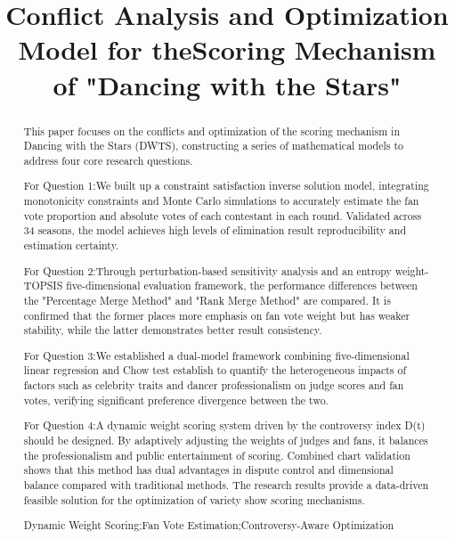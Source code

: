\documentclass{mcmthesis}
\title{Conflict Analysis and Optimization Model for theScoring Mechanism of "Dancing with the Stars"}
\begin{document}
\begin{abstract}
This paper focuses on the conflicts and optimization of the scoring mechanism in Dancing with the Stars (DWTS), constructing a series of mathematical models to address four core research questions.

For Question 1:We built up a constraint satisfaction inverse solution model, integrating monotonicity constraints and Monte Carlo simulations to accurately estimate the fan vote proportion and absolute votes of each contestant in each round. Validated across 34 seasons, the model achieves high levels of elimination result reproducibility and estimation certainty.

For Question 2:Through perturbation-based sensitivity analysis and an entropy weight-TOPSIS five-dimensional evaluation framework, the performance differences between the "Percentage Merge Method" and "Rank Merge Method" are compared. It is confirmed that the former places more emphasis on fan vote weight but has weaker stability, while the latter demonstrates better result consistency.

For Question 3:We established a dual-model framework combining five-dimensional linear regression and Chow test establish to quantify the heterogeneous impacts of factors such as celebrity traits and dancer professionalism on judge scores and fan votes, verifying significant preference divergence between the two.

For Question 4:A dynamic weight scoring system driven by the controversy index D(t) should be designed. By adaptively adjusting the weights of judges and fans, it balances the professionalism and public entertainment of scoring. Combined chart validation shows that this method has dual advantages in dispute control and dimensional balance compared with traditional methods. The research results provide a data-driven feasible solution for the optimization of variety show scoring mechanisms.

\begin{keywords}
Dynamic Weight Scoring;Fan Vote Estimation;Controversy-Aware Optimization
\end{keywords}
\end{abstract}
\maketitle
 \tableofcontents
 \newpage
\end{document}
